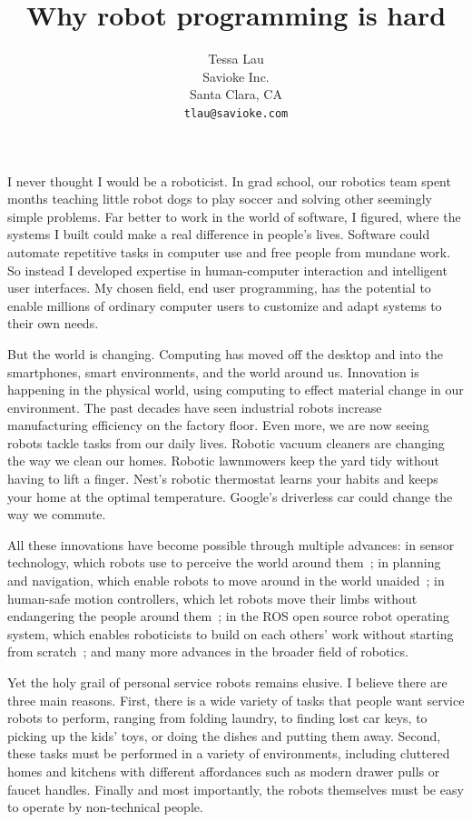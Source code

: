 \documentclass[10pt,twocolumn]{article}
\begin{document}
\title {Why robot programming is hard}
\author {Tessa Lau \\
Savioke Inc.\\
Santa Clara, CA\\
{\tt tlau@savioke.com}
}
\maketitle

I never thought I would be a roboticist. In grad school, our robotics team spent months teaching little robot dogs to play soccer and solving other seemingly simple problems. Far better to work in the world of software, I figured, where the systems I built could make a real difference in people's lives. Software could automate repetitive tasks in computer use and free people from mundane work. So instead I developed expertise in human-computer interaction and intelligent user interfaces. My chosen field, end user programming, has the potential to enable millions of ordinary computer users to customize and adapt systems to their own needs.

But the world is changing. Computing has moved off the desktop and into the smartphones, smart environments, and the world around us. Innovation is happening in the physical world, using computing to effect material change in our environment. The past decades have seen industrial robots increase manufacturing efficiency on the factory floor. Even more, we are now seeing robots tackle tasks from our daily lives. Robotic vacuum cleaners are changing the way we clean our homes. Robotic lawnmowers keep the yard tidy without having to lift a finger. Nest's robotic thermostat learns your habits and keeps your home at the optimal temperature. Google's driverless car could change the way we commute.

All these innovations have become possible through multiple advances: in sensor technology, which robots use to perceive the world around them~\cite{henry-iser10}; in planning and navigation, which enable robots to move around in the world unaided~\cite{jackel-cacm07}; in human-safe motion controllers, which let robots move their limbs without endangering the people around them~\cite{kemp-ieee07}; in the ROS open source robot operating system, which enables roboticists to build on each others' work without starting from scratch~\cite{quigley-icra09}; and many more advances in the broader field of robotics.

Yet the holy grail of personal service robots remains elusive. I believe there are three main reasons. First, there is a wide variety of tasks that people want service robots to perform, ranging from folding laundry, to finding lost car keys, to picking up the kids' toys, or doing the dishes and putting them away. Second, these tasks must be performed in a variety of environments, including cluttered homes and kitchens with different affordances such as modern drawer pulls or faucet handles. Finally and most importantly, the robots themselves must be easy to operate by non-technical people.
\end{document}
